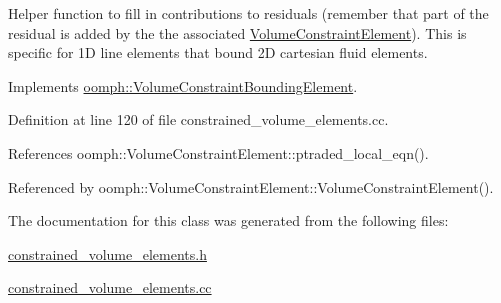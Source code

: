 Helper function to fill in contributions to residuals (remember that part of the residual is added by the the associated \hyperlink{classoomph_1_1VolumeConstraintElement}{Volume\+Constraint\+Element}). This is specific for 1D line elements that bound 2D cartesian fluid elements. 



Implements \hyperlink{classoomph_1_1VolumeConstraintBoundingElement_a717f1085709bd8820b8043ff94ecb0c5}{oomph\+::\+Volume\+Constraint\+Bounding\+Element}.



Definition at line 120 of file constrained\+\_\+volume\+\_\+elements.\+cc.



References oomph\+::\+Volume\+Constraint\+Element\+::ptraded\+\_\+local\+\_\+eqn().



Referenced by oomph\+::\+Volume\+Constraint\+Element\+::\+Volume\+Constraint\+Element().



The documentation for this class was generated from the following files\+:\begin{DoxyCompactItemize}
\item 
\hyperlink{constrained__volume__elements_8h}{constrained\+\_\+volume\+\_\+elements.\+h}\item 
\hyperlink{constrained__volume__elements_8cc}{constrained\+\_\+volume\+\_\+elements.\+cc}\end{DoxyCompactItemize}
